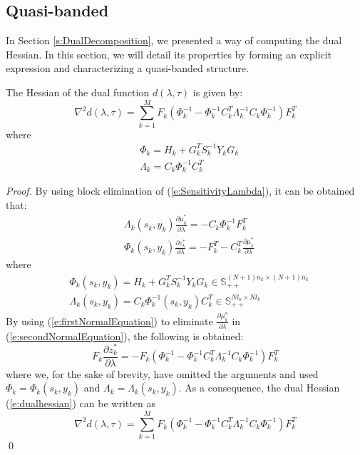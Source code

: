 \subsection{Quasi-banded}
In Section \ref{s:DualDecomposition}, we presented a way of computing the dual Hessian. In this section, we will detail its properties by forming an explicit expression and characterizing a quasi-banded structure.

\begin{proposition}
The Hessian of the dual function $d(\lambda, \tau)$ is given by:
\begin{equation}
\label{e:dualhessian2}
\nabla^2 d(\lambda, \tau) = \sum_{k=1}^M F_k (\Phi_k^{-1} - \Phi_k^{-1} C_k^T \Lambda_k^{-1} C_k \Phi_k^{-1}) F_k^T
\end{equation}
where
\begin{align}
& \Phi_k = H_k + G_k^T S_k^{-1} Y_k G_k \label{e:Phi} \\
& \Lambda_k = C_k \Phi_k^{-1} C_k^{T} \label{e:Lambda}
\end{align}
\end{proposition}
\begin{proof}
By using block elimination of (\ref{e:SensitivityLambda}), it can be obtained that:
\begin{subequations}
\begin{align}
& \Lambda_k (s_k, y_k) \frac{\partial \mu_k^*}{\partial \lambda} = -C_k \Phi_k^{-1} F_k^T \label{e:firstNormalEquation} \\
& \Phi_k (s_k, y_k) \frac{\partial z_k^*}{\partial \lambda} = -F_k^T - C_k^T \frac{\partial \mu_k^*}{\partial \lambda} \label{e:secondNormalEquation}
\end{align}
\end{subequations}
where
\begin{subequations}
\begin{align}
& \Phi_k (s_k, y_k) = H_k + G_k^T S_k^{-1} Y_k G_k \in \mathbb{S}_{++}^{(N+1)n_k \times (N+1)n_k} \\
& \Lambda_k (s_k, y_k) = C_k \Phi_k^{-1}(s_k, y_k) C_k^{T} \in \mathbb{S}_{++}^{N l_k \times N l_k}
\end{align}
\end{subequations}
By using (\ref{e:firstNormalEquation}) to eliminate $\frac{\partial \mu_k^*}{\partial \lambda}$ in (\ref{e:secondNormalEquation}), the following is obtained:
\begin{equation}
\label{e:localcontributions}
F_k \frac{\partial z_k^*}{\partial \lambda} = -F_k (\Phi_k^{-1} - \Phi_k^{-1} C_k^T \Lambda_k^{-1} C_k \Phi_k^{-1}) F_k^T
\end{equation}
where we, for the sake of brevity, have omitted the arguments and used $\Phi_k = \Phi_k(s_k, y_k)$ and $\Lambda_k = \Lambda_k (s_k, y_k)$. As a consequence, the dual Hessian (\ref{e:dualhessian}) can be written as
\begin{equation}
\nabla^2 d(\lambda, \tau) = \sum_{k=1}^M F_k (\Phi_k^{-1} - \Phi_k^{-1} C_k^T \Lambda_k^{-1} C_k \Phi_k^{-1}) F_k^T
\end{equation}
\qed
\end{proof}
